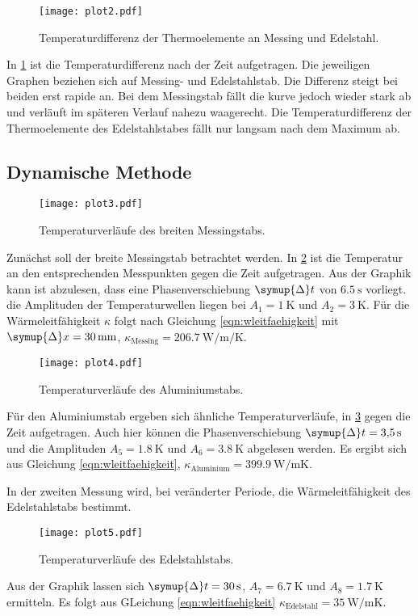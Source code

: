 \begin{figure}[H]
    \centering
    \texttt{[image: plot2.pdf]}
    \caption{Temperaturdifferenz der Thermoelemente an Messing und Edelstahl.}
    \label{fig:plot2}
\end{figure}


In \ref{fig:plot2} ist die Temperaturdifferenz nach der Zeit aufgetragen.
Die jeweiligen Graphen beziehen sich auf Messing- und Edelstahlstab.
Die Differenz steigt bei beiden erst rapide an.
Bei dem Messingstab fällt die kurve jedoch wieder stark ab und verläuft im späteren Verlauf nahezu waagerecht.
Die Temperaturdifferenz der Thermoelemente des Edelstahlstabes fällt nur langsam nach dem Maximum ab.


\subsection{Dynamische Methode}
\begin{figure}
    \centering
    \texttt{[image: plot3.pdf]}
    \caption{Temperaturverläufe des breiten Messingstabs.}
    \label{fig:plot3}
\end{figure}
Zunächst soll der breite Messingstab betrachtet werden.
In \ref{fig:plot3} ist die Temperatur an den entsprechenden Messpunkten gegen die Zeit aufgetragen. Aus der Graphik kann ist abzulesen,
dass eine Phasenverschiebung $\symup{\Delta} t$ von $\SI{6.5}{\second}$ vorliegt. die Amplituden der Temperaturwellen liegen
bei $A_1 = \SI{1}{\kelvin}$ und $A_2 = \SI{3}{\kelvin}$.
Für die Wärmeleitfähigkeit $\kappa$ folgt nach Gleichung \eqref{eqn:wleitfaehigkeit} mit $\symup{\Delta}x = \SI{30}{\milli\meter}$,
$\kappa_\text{Messing} = \SI{206.7}{\watt\per\meter\per\kelvin}$.
\begin{figure}
    \centering
    \texttt{[image: plot4.pdf]}
    \caption{Temperaturverläufe des Aluminiumstabs.}
    \label{fig:plot4}
\end{figure}

Für den Aluminiumstab ergeben sich ähnliche Temperaturverläufe, in \ref{fig:plot4} gegen die Zeit aufgetragen. Auch hier können die
Phasenverschiebung $\symup{\Delta} t = \SI{3.5}{\second}$ und die Amplituden $A_5 = \SI{1.8}{\kelvin}$ und $A_6 = \SI{3.8}{\kelvin}$
abgelesen werden. Es ergibt sich aus Gleichung \eqref{eqn:wleitfaehigkeit}, $\kappa_\text{Aluminium} =
\SI{399.9}{\watt\per\meter\kelvin}$.

In der zweiten Messung wird, bei veränderter Periode, die Wärmeleitfähigkeit des Edelstahlstabs bestimmt.
\begin{figure}[H]
    \centering
    \texttt{[image: plot5.pdf]}
    \caption{Temperaturverläufe des Edelstahlstabs.}
    \label{fig:plot5}
\end{figure}
Aus der Graphik lassen sich $\symup{\Delta} t = \SI{30}{\second}$, $A_7 = \SI{6.7}{\kelvin}$ und $A_8 = \SI{1.7}{\kelvin}$ ermitteln.
Es folgt aus GLeichung \eqref{eqn:wleitfaehigkeit} $\kappa_\text{Edelstahl} = \SI{35}{\watt\per\meter\kelvin}$.

